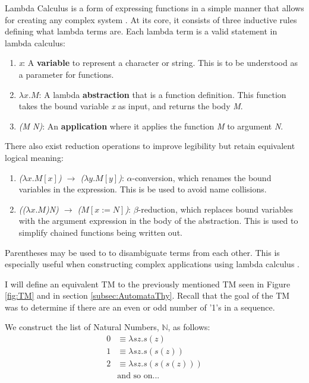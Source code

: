 Lambda Calculus is a form of expressing functions in a simple manner that allows for creating any complex system \cite{LambdaCalcRG}.
At its core, it consists of three inductive rules defining what lambda terms are.
Each lambda term is a valid statement in lambda calculus:
\begin{enumerate}
    \item \textit{x}: A \textbf{variable} to represent a character or string.
    This is to be understood as a parameter for functions.
    \item \textit{$\lambda x.M$}: A lambda \textbf{abstraction} that is a function definition.
    This function takes the bound variable \textit{x} as input, and returns the body \textit{M}.
    \item \textit{(M N)}: An \textbf{application} where it applies the function \textit{M} to argument \textit{N}.
\end{enumerate}

\vspace{1cm}
There also exist reduction operations to improve legibility but retain equivalent logical meaning:

\begin{enumerate}
    \item \textit{($\lambda x.M[x]$) $\rightarrow$ ($\lambda y.M[y]$)}: $\alpha$-conversion, which renames the bound variables in the expression.
    This is be used to avoid name collisions.
    \item \textit{(($\lambda x.M$)\textit{N}) $\rightarrow$ ($M[x:=N]$)}: $\beta$-reduction, which replaces bound variables with the argument expression in the body of the abstraction.
    This is used to simplify chained functions being written out.
\end{enumerate}

Parentheses may be used to to disambiguate terms from each other.
This is especially useful when constructing complex applications using lambda calculus \cite{LambdaCalcWiki}.

I will define an equivalent TM to the previously mentioned TM seen in Figure \ref{fig:TM} and in section \ref{subsec:AutomataThy}.
Recall that the goal of the TM was to determine if there are an even or odd number of '1's in a sequence.

We construct the list of Natural Numbers, $\mathbb{N}$, as follows:
\[
    \begin{aligned}
        0 &\equiv \lambda sz.s(z)\\
        1 &\equiv \lambda sz.s(s(z))\\
        2 &\equiv \lambda sz.s(s(s(z)))\\
        &\text{and so on...}\\
    \end{aligned}
\]

